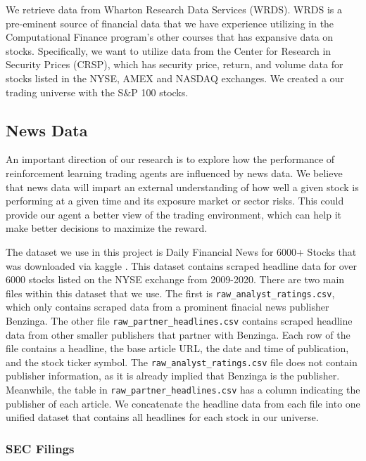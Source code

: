 We retrieve data from Wharton Research Data Services 
(WRDS). WRDS is a pre-eminent source of financial data that we have experience 
utilizing in the Computational Finance program’s other courses that has expansive 
data on stocks. Specifically, we want to utilize data from the Center for Research in 
Security Prices (CRSP), which has security price, return, and volume data for stocks listed in the 
NYSE, AMEX and NASDAQ exchanges. We created a our trading universe with the S$\&$P 100 stocks.

\subsection{News Data}

An important direction of our research is to explore how the performance 
of reinforcement learning trading agents are influenced by news data.
We believe that news data will impart an external understanding of how 
well a given stock is performing at a given time and its exposure market or sector risks. 
This could provide our agent a better view of the trading environment, which 
can help it make better decisions to maximize the reward. 

The dataset we use in this project is Daily Financial News for 6000+ Stocks that was downloaded via kaggle \cite{financial_news}.
This dataset contains scraped headline data for over 6000 stocks listed on the NYSE exchange from 2009-2020. 
There are two main files within this dataset that we use. The first is \texttt{raw\_analyst\_ratings.csv}, which only contains scraped data from a prominent finacial news publisher Benzinga.
The other file \texttt{raw\_partner\_headlines.csv} contains scraped headline data from other smaller publishers that partner with Benzinga. Each row of the file contains a headline, the base article URL, the date and time of publication, and the stock ticker symbol.
The \texttt{raw\_analyst\_ratings.csv} file does not contain publisher information, as it is already implied that Benzinga is the publisher. Meanwhile, the table in \texttt{raw\_partner\_headlines.csv} has a column indicating the publisher of each article. 
We concatenate the headline data from each file into one unified dataset that contains all headlines for each stock in our universe.


\subsubsection{SEC Filings}

